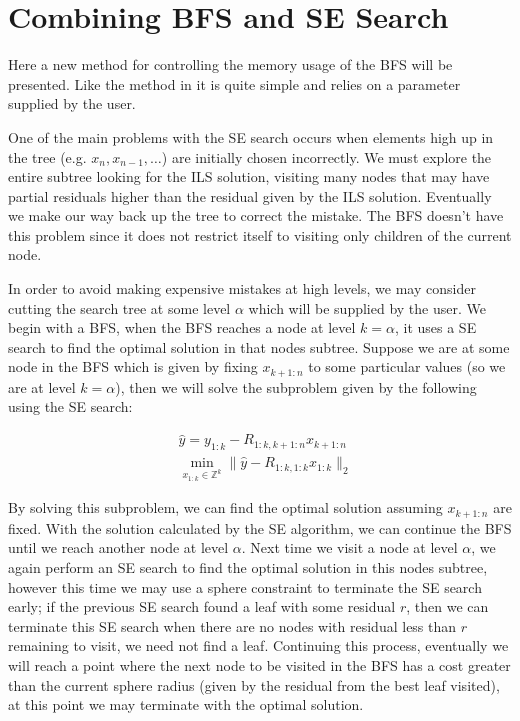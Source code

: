 \documentclass[12pt,Bold,letterpaper]{mcgilletdclass}
\newcommand{\vsp}{\vspace{\baselineskip}}
\begin{document}
\vsp \section{Combining BFS and SE Search}

Here a new method for controlling the memory usage of the BFS will be presented. Like the method in \cite{StuBF07} it is quite simple and relies on a parameter supplied by the user.

One of the main problems with the SE search occurs when elements high up in the tree (e.g. $x_n, x_{n-1} , \dots$) are initially chosen incorrectly. We must explore the entire subtree looking for the ILS solution, visiting many nodes that may have partial residuals higher than the residual given by the ILS solution. Eventually we make our way back up the tree to correct the mistake. The BFS doesn't have this problem since it does not restrict itself to visiting only children of the current node.

In order to avoid making expensive mistakes at high levels, we may consider cutting the search tree at some level $\alpha$ which will be supplied by the user. We begin with a BFS, when the BFS reaches a node at level $k=\alpha$, it uses a SE search to find the optimal solution in that nodes subtree. Suppose we are at some node in the BFS which is given by fixing $x_{k+1:n}$ to some particular values (so we are at level $k=\alpha$), then we will solve the subproblem  given by the following using the SE search:

\begin{align} 
&\hat{y} = y_{1:k} - R_{1:k,k+1:n}x_{k+1:n} \\
&\min_{x_{1:k} \in {\mathbb{Z}^k }}  \| \hat{y} - R_{1:k,1:k}x_{1:k} \|_2
\end{align}

By solving this subproblem, we can find the optimal solution assuming $x_{k+1:n}$ are fixed. With the solution calculated by the SE algorithm, we can continue the BFS until we reach another node at level $\alpha$. Next time we visit a node at level $\alpha$, we again perform an SE search to find the optimal solution in this nodes subtree, however this time we may use a sphere constraint to terminate the SE search early; if the previous SE search found a leaf with some residual $r$, then we can terminate this SE search when there are no nodes with residual less than $r$ remaining to visit, we need not find a leaf. Continuing this process, eventually we will reach a point where the next node to be visited in the BFS has a cost greater than the current sphere radius (given by the residual from the best leaf visited), at this point we may terminate with the optimal solution.
\end{document}
